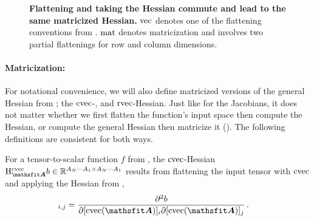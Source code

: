\switchcolumn[1]
\begin{figure}[!h]
  \centering
  \caption{\textbf{Flattening and taking the Hessian commute and lead to the same matricized Hessian.}
    $\vec$ denotes one of the flattening conventions from .
    $\mat$ denotes matricization and involves two partial flattenings for row and column dimensions.}\label{fig:commutative-diagram-hessian}
\end{figure}
\switchcolumn[0]

\paragraph{Matricization:} For notational convenience, we will also define matricized versions of the general Hessian from ; the $\cvec$-, and $\rvec$-Hessian. Just like for the Jacobians, it does not matter whether we first flatten the function's input space then compute the Hessian, or compute the general Hessian then matricize it ().
The following definitions are consistent for both ways.

\switchcolumn[1]
\switchcolumn[0]

\begin{definition}\label{def:cvec_hessian}
  For a tensor-to-scalar function $f$ from , the $\cvec$-Hessian $\hess_{\tA}^{\cvec}b \in \sR^{A_N \cdots A_1 \times A_N \cdots A_1}$ results from flattening the input tensor with $\cvec$ and applying the Hessian from ,
  \begin{align*}
    [\hess^{\cvec}_{\tA}b]_{i, j}
     & =
    \frac{\partial^2 b}{\partial [\cvec(\tA)]_{i} \partial [\cvec(\tA)]_{j}}\,.
  \end{align*}
\end{definition}

